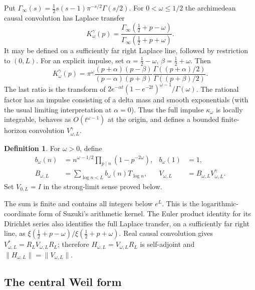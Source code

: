 \documentclass[11pt]{article}
\numberwithin{equation}{section}
\theoremstyle{definition}
\newtheorem{definition}[theorem]{Definition}
\theoremstyle{remark}
\newcommand{\norm}[1]{\lVert#1\rVert}
\newcommand{\gam}{\Gamma_\infty}
\begin{document}
Put $\gam(s)=\tfrac12s(s-1)\pi^{-s/2}\Gamma(s/2)$. For $0<\omega\le1/2$
the archimedean causal convolution has Laplace transfer
\begin{equation}\label{eq:gammaK}
 K^\gamma_\omega(p)=
 \frac{\gam(\tfrac12+p-\omega)}{\gam(\tfrac12+p+\omega)}.
\end{equation}
It may be defined on a sufficiently far right Laplace line, followed by
restriction to $(0,L)$. For an explicit impulse, set
$\alpha=\tfrac12-\omega$, $\beta=\tfrac12+\omega$. Then
\begin{equation}\label{eq:gammafactor}
 K^\gamma_\omega(p)=\pi^\omega
 \frac{(p+\alpha)(p-\beta)}{(p-\alpha)(p+\beta)}
 \frac{\Gamma((p+\alpha)/2)}{\Gamma((p+\beta)/2)}.
\end{equation}
The last ratio is the transform of
$2e^{-\alpha t}(1-e^{-2t})^{\omega-1}/\Gamma(\omega)$.
The rational factor has an impulse consisting of a delta mass and smooth
exponentials (with the usual limiting interpretation at $\alpha=0$).
Thus the full impulse $\kappa_\omega$ is locally integrable, behaves as
$O(t^{\omega-1})$ at the origin, and defines a bounded finite-horizon
convolution $V^\gamma_{\omega,L}$.

\begin{definition}\label{def:transfer}
For $\omega>0$, define
\begin{align}
 b_\omega(n)&=n^{\omega-1/2}\prod_{p\mid n}(1-p^{-2\omega}),
 & b_\omega(1)&=1,\label{eq:bcoeff}\\
 B_{\omega,L}&=\sum_{\log n<L}b_\omega(n)T_{\log n},
 &V_{\omega,L}&=B_{\omega,L}V^\gamma_{\omega,L}.\label{eq:Vdef}
\end{align}
Set $V_{0,L}=I$ in the strong-limit sense proved below.
\end{definition}

The sum is finite and contains all integers below $e^L$. This is the
logarithmic-coordinate form of Suzuki's arithmetic kernel. The Euler product
identity for its Dirichlet series also identifies the full Laplace transfer,
on a sufficiently far right line, as
$\xi(\tfrac12+p-\omega)/\xi(\tfrac12+p+\omega)$.
Real causal convolution gives $V_{\omega,L}^*=R_LV_{\omega,L}R_L$;
therefore $H_{\omega,L}=V_{\omega,L}R_L$ is self-adjoint and
$\norm{H_{\omega,L}}=\norm{V_{\omega,L}}$.

\subsection{The central Weil form}
\end{document}
